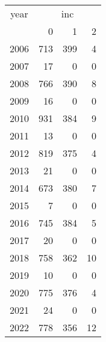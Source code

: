 \footnotesize\begin{tabular}[t]{lrrr}
\toprule
\multicolumn{1}{c}{year} & \multicolumn{3}{c}{inc} \\
\cmidrule(l{3pt}r{3pt}){1-1} \cmidrule(l{3pt}r{3pt}){2-4}
  & 0 & 1 & 2\\
\midrule
2006 & 713 & 399 & 4\\
2007 & 17 & 0 & 0\\
2008 & 766 & 390 & 8\\
2009 & 16 & 0 & 0\\
2010 & 931 & 384 & 9\\
2011 & 13 & 0 & 0\\
2012 & 819 & 375 & 4\\
2013 & 21 & 0 & 0\\
2014 & 673 & 380 & 7\\
2015 & 7 & 0 & 0\\
2016 & 745 & 384 & 5\\
2017 & 20 & 0 & 0\\
2018 & 758 & 362 & 10\\
2019 & 10 & 0 & 0\\
2020 & 775 & 376 & 4\\
2021 & 24 & 0 & 0\\
2022 & 778 & 356 & 12\\
\bottomrule
\end{tabular}
